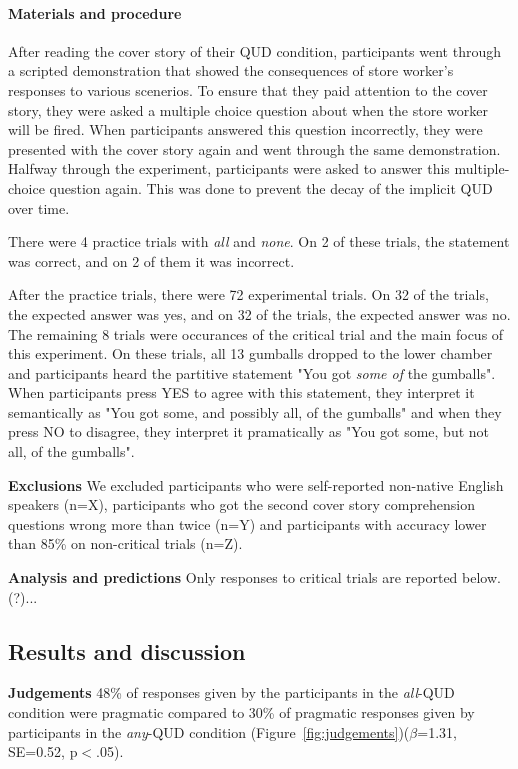 \documentclass[10pt,letterpaper]{article}
\begin{document}
\paragraph{Materials and procedure}
After reading the cover story of their QUD condition, participants went through a scripted demonstration that showed the consequences of store worker's responses to various scenerios. To ensure that they paid attention to the cover story, they were asked a multiple choice question about when the store worker will be fired. When participants answered this question incorrectly, they were presented with the cover story again and went through the same demonstration. Halfway through the experiment, participants were asked to answer this multiple-choice question again. This was done to prevent the decay of the implicit QUD over time.

There were 4 practice trials with \textit{all} and \textit{none}. On 2 of these trials, the statement was correct, and on 2 of them it was incorrect.

After the practice trials, there were 72 experimental trials. On 32 of the trials, the expected answer was yes, and on 32 of the trials, the expected answer was no. The remaining 8 trials were occurances of the critical trial and the main focus of this experiment. On these trials, all 13 gumballs dropped to the lower chamber and participants heard the partitive statement "You got \textit{some of} the gumballs". When participants press YES to agree with this statement, they interpret it semantically as "You got some, and possibly all, of the gumballs" and when they press NO to disagree, they interpret it pramatically as "You got some, but not all, of the gumballs". 

\noindent \textbf{Exclusions} We excluded participants who were self-reported non-native English speakers (n=X), participants who got the second cover story comprehension questions wrong more than twice (n=Y) and participants with accuracy lower than 85\% on non-critical trials (n=Z).

\noindent \textbf{Analysis and predictions} Only responses to critical trials are reported below. (?)...

\subsection{Results and discussion}
\noindent \textbf{Judgements}
48\% of responses given by the participants in the \textit{all}-QUD condition were pragmatic compared to 30\% of pragmatic responses given by participants in the \textit{any}-QUD condition (Figure~\ref{fig:judgements})($\beta$=1.31, SE=0.52, p$<$.05).
\end{document}
